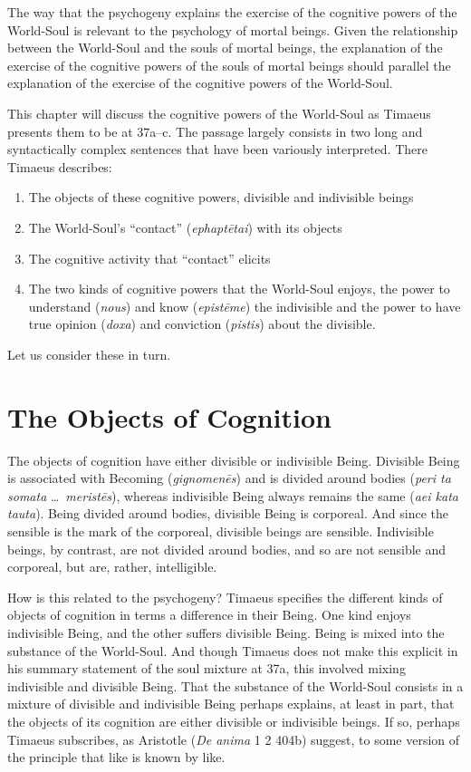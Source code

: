 The way that the psychogeny explains the exercise of the cognitive powers of the World-Soul is relevant to the psychology of mortal beings. Given the relationship between the World-Soul and the souls of mortal beings, the explanation of the exercise of the cognitive powers of the souls of mortal beings should parallel the explanation of the exercise of the cognitive powers of the World-Soul. 

This chapter will discuss the cognitive powers of the World-Soul as Timaeus presents them to be at 37a--c. The passage largely consists in two long and syntactically complex sentences that have been variously interpreted. There Timaeus describes:
\begin{enumerate}[(1)]
	\item The objects of these cognitive powers, divisible and indivisible beings
	\item The World-Soul's ``contact'' (\emph{ephaptētai}) with its objects
	\item The cognitive activity that ``contact'' elicits
	\item The two kinds of cognitive powers that the World-Soul enjoys, the power to understand (\emph{nous}) and know (\emph{epistēme}) the indivisible and the power to have true opinion (\emph{doxa}) and conviction (\emph{pistis}) about the divisible.
\end{enumerate}
Let us consider these in turn.


\section{The Objects of Cognition} %
\label{sec:the_objects_of_cognition}

The objects of cognition have either divisible or indivisible Being. Divisible Being is associated with Becoming (\emph{gignomenēs}) and is divided around bodies (\emph{peri ta somata} \ldots\ \emph{meristēs}), whereas indivisible Being always remains the same (\emph{aei kata tauta}). Being divided around bodies, divisible Being is corporeal. And since the sensible is the mark of the corporeal, divisible beings are sensible. Indivisible beings, by contrast, are not divided around bodies, and so are not sensible and corporeal, but are, rather, intelligible.

How is this related to the psychogeny? Timaeus specifies the different kinds of objects of cognition in terms a difference in their Being. One kind enjoys indivisible Being, and the other suffers divisible Being. Being is mixed into the substance of the World-Soul. And though Timaeus does not make this explicit in his summary statement of the soul mixture at 37a, this involved mixing indivisible and divisible Being. That the substance of the World-Soul consists in a mixture of divisible and indivisible Being perhaps explains, at least in part, that the objects of its cognition are either divisible or indivisible beings. If so, perhaps Timaeus subscribes, as Aristotle (\emph{De anima} 1 2 404b) suggest, to some version of the principle that like is known by like. 

